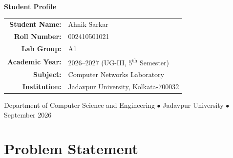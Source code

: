 \documentclass[11pt,a4paper]{article}
\begin{document}
\begin{titlepage}
\begin{tcolorbox}[
    enhanced,
    colback=lightgold,
    colframe=goldaccent!80!navyblue,
    boxrule=0.8pt,
    arc=2mm,
    width=0.8\textwidth,
    left=12pt, right=12pt, top=8pt, bottom=8pt
]
\centering
\textbf{\color{navyblue}\normalsize Student Profile}\\[0.2cm]
\renewcommand{\arraystretch}{1.2}
\small
\begin{tabular}{r l}
    \textbf{\color{navyblue}Student Name:} & Ahnik Sarkar \\
    \textbf{\color{navyblue}Roll Number:} & 002410501021 \\
    \textbf{\color{navyblue}Lab Group:} & A1 \\
    \textbf{\color{navyblue}Academic Year:} & 2026--2027 (UG-III, 5\textsuperscript{th} Semester) \\
    \textbf{\color{navyblue}Subject:} & Computer Networks Laboratory \\
    \textbf{\color{navyblue}Institution:} & Jadavpur University, Kolkata-700032 \\
\end{tabular}
\end{tcolorbox}

\vfill


\vspace{0.2cm}
{\scriptsize\color{gray}Department of Computer Science and Engineering $\bullet$ Jadavpur University $\bullet$ September 2026}

\end{titlepage}
\hypersetup{pageanchor=true}

\clearpage
{}
\pagestyle{fancy}

\tableofcontents

\vspace{0.6cm}

\section{Problem Statement}
\end{document}
